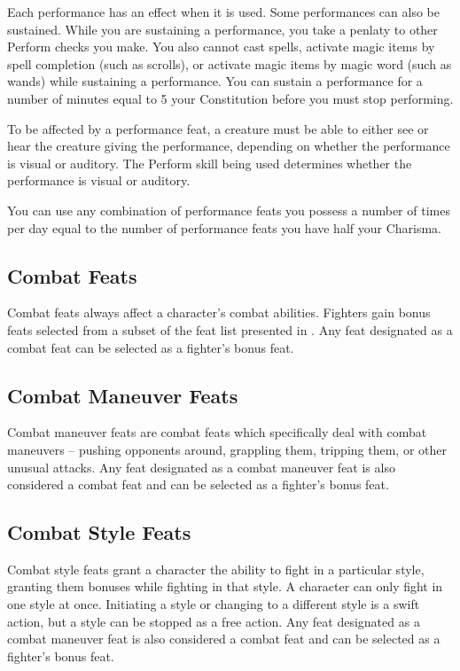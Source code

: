Each performance has an effect when it is used. Some performances can also be sustained. While you are sustaining a performance, you take a  penlaty to other Perform checks you make. You also cannot cast spells, activate magic items by spell completion (such as scrolls), or activate magic items by magic word (such as wands) while sustaining a performance. You can sustain a performance for a number of minutes equal to 5 \add your Constitution before you must stop performing.

To be affected by a performance feat, a creature must be able to either see or hear the creature giving the performance, depending on whether the performance is visual or auditory. The Perform skill being used determines whether the performance is visual or auditory. 

You can use any combination of performance feats you possess a number of times per day equal to the number of performance feats you have \add half your Charisma.

\subsection{Combat Feats}
Combat feats always affect a character's combat abilities. Fighters gain bonus feats selected from a subset of the feat list presented in . Any feat designated as a combat feat can be selected as a fighter's bonus feat.

\subsection{Combat Maneuver Feats}
Combat maneuver feats are combat feats which specifically deal with combat maneuvers -- pushing opponents around, grappling them, tripping them, or other unusual attacks. Any feat designated as a combat maneuver feat is also considered a combat feat and can be selected as a fighter's bonus feat.

\subsection{Combat Style Feats}
Combat style feats grant a character the ability to fight in a particular style, granting them bonuses while fighting in that style. A character can only fight in one style at once. Initiating a style or changing to a different style is a swift action, but a style can be stopped as a free action. Any feat designated as a combat maneuver feat is also considered a combat feat and can be selected as a fighter's bonus feat.

